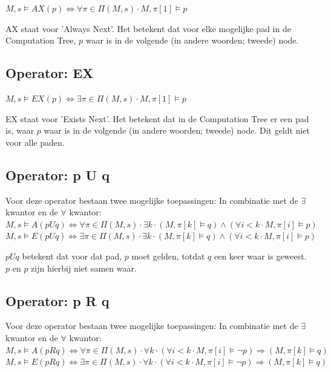 \documentclass{article}
\begin{document}
		\( M, s \models AX(p) \iff \forall \pi \in \Pi (M, s) \cdot M, \pi [1] \models p\)

		AX staat voor 'Always Next'. Het betekent dat voor elke mogelijke pad in de Computation Tree, \( p \) waar is in de volgende (in andere woorden; tweede) node. 
		
		\subsection{Operator: EX}
				
		\( M, s \models EX(p) \iff \exists \pi \in \Pi (M, s) \cdot M, \pi [1] \models p\)

		EX staat voor 'Exists Next'. Het betekent dat in de Computation Tree er een pad is, waar \( p \) waar is in de volgende (in andere woorden; tweede) node. Dit geldt niet voor alle paden.
		
		\subsection{Operator: p U q}
		
			Voor deze operator bestaan twee mogelijke toepassingen: In combinatie met de \( \exists \) kwantor en de \( \forall \) kwantor: \\
		\( M, s \models A(pUq) \iff \forall \pi \in \Pi (M, s) \cdot \exists k \cdot (M, \pi [k] \models q) \land (\forall i < k \cdot M, \pi[i] \models p)\) \\
		\( M, s \models E(pUq) \iff \exists \pi \in \Pi (M, s) \cdot \exists k \cdot (M, \pi [k] \models q) \land (\forall i < k \cdot M, \pi[i] \models p)\)  \par

		\noindent \(p U q\) betekent dat voor dat pad, \(p\) moet gelden, totdat \(q\) een keer waar is geweest. \(p\) en \(p\) zijn hierbij niet samen waar.

		\subsection{Operator: p R q}
				
			Voor deze operator bestaan twee mogelijke toepassingen: In combinatie met de \( \exists \) kwantor en de \( \forall \) kwantor: \\
		\( M, s \models A(pRq) \iff \forall \pi \in \Pi (M, s) \cdot \forall k \cdot (\forall i < k \cdot M, \pi [i] \models \neg p) \Rightarrow (M, \pi [k] \models q) \) \\
		\( M, s \models E(pRq) \iff \exists \pi \in \Pi (M, s) \cdot \forall k \cdot (\forall i < k \cdot M, \pi [i] \models \neg p) \Rightarrow (M, \pi [k] \models q) \) \par
\end{document}
